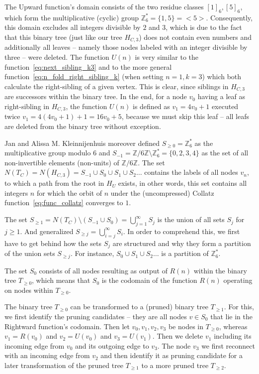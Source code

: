 The Upward function's domain consists of the two residue classes $[1]_6,[5]_6$, which form the multiplicative (cyclic) group $\mathbb{Z}^\ast_6=\{1,5\}=<5>$. Consequently, this domain excludes all integers divisible by $2$ and $3$, which is due to the fact that this binary tree (just like our tree $H_{C,3}$) does not contain even numbers and additionally all leaves -- namely those nodes labeled with an integer divisible by three -- were deleted. The function $U(n)$ is very similar to the function~\ref{eq:next_sibling_k3} and to the more general function~\ref{eq:n_fold_right_sibling_k} (when setting $n=1,k=3$) which both calculate the right-sibling of a given vertex. This is clear, since siblings in $H_{C,3}$ are successors within the binary tree. In the end, for a node $v_0$ having a leaf as right-sibling in $H_{C,3}$, the function $U(n)$ is defined as $v_1=4v_0+1$ executed twice $v_1=4(4v_0+1)+1=16v_0+5$, because we must skip this leaf -- all leafs are deleted from the binary tree without exception.

Jan and Alissa M. Kleinnijenhuis \cite{Ref_Kleinnijenhuis} moreover defined $S_{\ge0}=\mathbb{Z}^\ast_6$ as the multiplicative group modulo $6$ and $S_{-1}=\mathbb{Z}/6\mathbb{Z}\setminus\mathbb{Z}^\ast_6=\{0,2,3,4\}$ as the set of all non-invertible elements (non-units) of $\mathbb{Z}/6\mathbb{Z}$. The set $N(T_C)=N(H_{C,3})=S_{-1}\cup S_0\cup S_1\cup S_2\ldots$ contains the labels of all nodes $v_n$, to which a path from the root in $H_U$ exists, in other words, this set contains all integers $n$ for which the orbit of $n$ under the (uncompressed) Collatz function~\ref{eq:func_collatz} converges to $1$.

The set $S_{\ge1}=N(T_C)\setminus(S_{-1}\cup S_{0})=\bigcup_{j=1}^{\infty}S_j$ is the union of all sets $S_j$ for $j\ge1$. And generalized $S_{\ge j}=\bigcup_{i=j}^{\infty}S_i$. In order to comprehend this, we first have to get behind how the sets $S_j$ are structured and why they form a partition of the union sets $S_{\ge j}$. For instance, $S_0\cup S_1\cup S_2\ldots$ is a partition of $\mathbb{Z}^\ast_6$.

The set $S_0$ consists of all nodes resulting as output of $R(n)$ within the binary tree $T_{\ge0}$, which means that $S_0$ is the codomain of the function $R(n)$ operating on nodes within $T_{\ge0}$.

The binary tree $T_{\ge0}$ can be transformed to a (pruned) binary tree $T_{\ge1}$. For this, we first identify the pruning candidates -- they are all nodes $v\in S_0$ that lie in the Rightward function's codomain. Then let $v_0,v_1,v_2,v_3$ be nodes in $T_{\ge0}$, whereas $v_1=R(v_0)$ and $v_2=U(v_0)$ and $v_3=U(v_1)$. Then we delete $v_1$ including its incoming edge from $v_0$ and its outgoing edge to $v_3$. The node $v_3$ we first reconnect with an incoming edge from $v_2$ and then identify it as pruning candidate for a later transformation of the pruned tree $T_{\ge1}$ to a more pruned tree $T_{\ge2}$.

